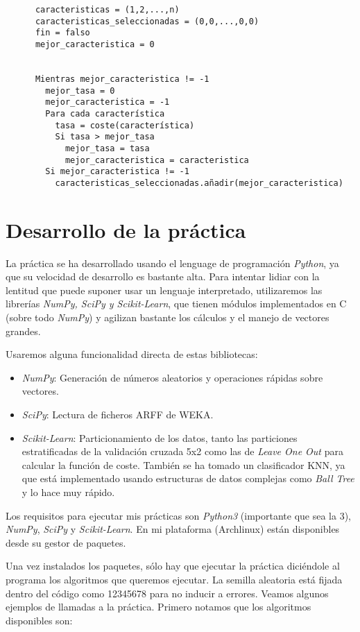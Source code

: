\documentclass[a4paper, 11pt]{article}
\begin{document}
    \begin{verbatim}
      caracteristicas = (1,2,...,n)
      caracteristicas_seleccionadas = (0,0,...,0,0)
      fin = falso
      mejor_caracteristica = 0


      Mientras mejor_caracteristica != -1
        mejor_tasa = 0
        mejor_caracteristica = -1
        Para cada característica
          tasa = coste(característica)
          Si tasa > mejor_tasa
            mejor_tasa = tasa
            mejor_caracteristica = caracteristica
        Si mejor_caracteristica != -1
          caracteristicas_seleccionadas.añadir(mejor_caracteristica)
    \end{verbatim}
  \section{Desarrollo de la práctica}
    La práctica se ha desarrollado usando el lenguage de programación \emph{Python}, ya que su velocidad de desarrollo es bastante alta. Para intentar lidiar con la lentitud que puede suponer usar un lenguaje interpretado, utilizaremos las librerías \emph{NumPy, SciPy y Scikit-Learn}, que tienen módulos implementados en C (sobre todo \emph{NumPy}) y agilizan bastante los cálculos y el manejo de vectores grandes.

    Usaremos alguna funcionalidad directa de estas bibliotecas:
    \begin{itemize}
      \item \emph{NumPy}: Generación de números aleatorios y operaciones rápidas sobre vectores.
      \item \emph{SciPy}: Lectura de ficheros ARFF de WEKA.
      \item \emph{Scikit-Learn}: Particionamiento de los datos, tanto las particiones estratificadas de la validación cruzada 5x2 como las de \emph{Leave One Out} para calcular la función de coste. También se ha tomado un clasificador KNN, ya que está implementado usando estructuras de datos complejas como \emph{Ball Tree} y lo hace muy rápido.
    \end{itemize}

    Los requisitos para ejecutar mis prácticas son \emph{Python3} (importante que sea la 3), \emph{NumPy}, \emph{SciPy} y \emph{Scikit-Learn}. En mi plataforma (Archlinux) están disponibles desde su gestor de paquetes.

    Una vez instalados los paquetes, sólo hay que ejecutar la práctica diciéndole al programa los algoritmos que queremos ejecutar. La semilla aleatoria está fijada dentro del código como 12345678 para no inducir a errores. Veamos algunos ejemplos de llamadas a la práctica. Primero notamos que los algoritmos disponibles son:
\end{document}

